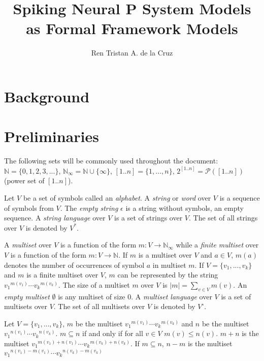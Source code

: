 \documentclass[a4paper]{article}
\theoremstyle{definition}
\newcommand{\ra}{\rightarrow}
\begin{document}
\title
{
   Spiking Neural P System Models\\ as Formal Framework Models
}


\author
{
   Ren Tristan A. de la Cruz
}


\maketitle


\section{Background}


\section{Preliminaries}

The following sets will be commonly used throughout the document: $\mathbb{N} = \{0,1,2,3,...\}$,
$\mathbb{N}_{\infty} = \mathbb{N} \cup \{\infty\}$, $[1..n] = \{1,...,n\}$, 
$2^{[1..n]}=\mathcal{P}([1..n])$ (power set of $[1..n]$).

Let $V$ be a set of symbols called an \emph{alphabet}. A \emph{string} or \emph{word} over $V$ is
a sequence of symbols from $V$. The \emph{empty string} $\epsilon$ is a string without symbols, an 
empty sequence. A \emph{string language} over $V$ is a set of strings over $V$. The set of all 
strings over $V$ is denoted by $V^*$.

A \emph{multiset} over $V$ is a function of the form $m: V \ra \mathbb{N}_{\infty}$ while a
\emph{finite multiset} over $V$ is a function of the form $m: V \ra \mathbb{N}$. If $m$ is a
multiset over $V$ and $a \in V$, $m(a)$ denotes the number of occurrences of symbol $a$ in multiset
$m$. If $V=\{v_1,...,v_k\}$ and $m$ is a finite multiset over $V$, $m$ can be represented by the
string ${v_1}^{m(v_1)}\cdots {v_k}^{m(v_k)}$. The size of a multiset $m$ over $V$ is
$|m| = \sum_{v\in V}m(v)$. An \emph{empty multiset} $\emptyset$ is any multiset of size $0$. A 
\emph{multiset language} over $V$ is a set of multisets over $V$. The set of all multisets over $V$ is denoted by
$V^{\circ}$.

Let $V=\{v_1,...,v_k\}$, $m$ be the multiset ${v_1}^{m(v_1)}\cdots{v_k}^{m(v_k)}$ and $n$ be the  
multiset ${v_1}^{n(v_1)}\cdots{v_k}^{n(v_k)}$. $m \subseteq n$ if and only if for all $v \in V$ 
$m(v) \leq n(v)$. $m+n$ is the multiset ${v_1}^{m(v_1)+n(v_1)}\cdots {v_k}^{m(v_k)+n(v_k)}$. If 
$m \subseteq n$, $n-m$ is the multiset ${v_1}^{n(v_1)-m(v_1)}\cdots {v_k}^{n(v_k)-m(v_k)}$
\end{document}
